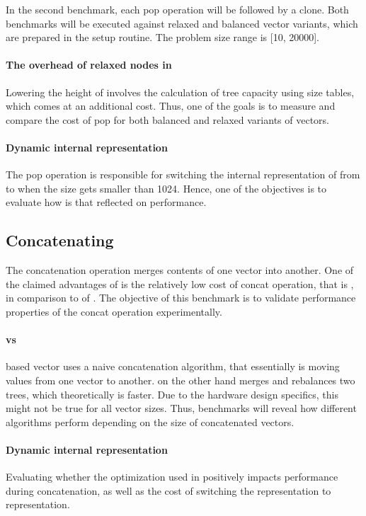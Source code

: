 In the second benchmark, each pop operation will be followed by a clone. Both benchmarks will be executed against relaxed and balanced vector variants, which are prepared in the setup routine. The problem size range is [10, 20000].

\paragraph*{The overhead of relaxed nodes in \rrbtree{}}
Lowering the height of \rrbtree{} involves the calculation of tree capacity using size tables, which comes at an additional cost. Thus, one of the goals is to measure and compare the cost of pop for both balanced and relaxed variants of vectors. 

\paragraph*{Dynamic internal representation}
The pop operation is responsible for switching the internal representation of \pvec{} from \rrbvec{} to \stdvec{} when the size gets smaller than 1024. Hence, one of the objectives is to evaluate how is that reflected on performance. 

\subsection{Concatenating}
The concatenation operation merges contents of one vector into another. One of the claimed advantages of \rrbtree{} is the relatively low cost of concat operation, that is  , in comparison to  of \stdvec{}. The objective of this benchmark is to validate performance properties of the concat operation experimentally. 

\paragraph*{\rbtree{} vs \rrbtree{}}
\rbtree{} based vector uses a naive concatenation algorithm, that essentially is moving values from one vector to another. \rrbtree on the other hand merges and rebalances two trees, which theoretically is faster. Due to the hardware design specifics, this might not be true for all vector sizes. Thus, benchmarks will reveal how different algorithms perform depending on the size of concatenated vectors. 

\paragraph*{Dynamic internal representation}
Evaluating whether the \stdvec{} optimization used in \pvec{} positively impacts performance during concatenation, as well as the cost of switching the representation to \rrbvec{} representation. 

